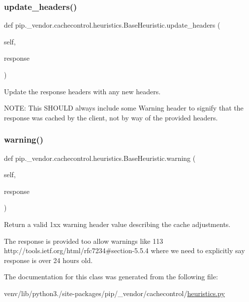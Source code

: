 \subsubsection{\texorpdfstring{update\+\_\+headers()}{update\_headers()}}
{\footnotesize\ttfamily def pip.\+\_\+vendor.\+cachecontrol.\+heuristics.\+Base\+Heuristic.\+update\+\_\+headers (\begin{DoxyParamCaption}\item[{}]{self,  }\item[{}]{response }\end{DoxyParamCaption})}

\begin{DoxyVerb}Update the response headers with any new headers.

NOTE: This SHOULD always include some Warning header to
      signify that the response was cached by the client, not
      by way of the provided headers.
\end{DoxyVerb}
 \mbox{\label{classpip_1_1__vendor_1_1cachecontrol_1_1heuristics_1_1BaseHeuristic_a60981da360ad1a5e7d01adc126f52b58}} 
\subsubsection{\texorpdfstring{warning()}{warning()}}
{\footnotesize\ttfamily def pip.\+\_\+vendor.\+cachecontrol.\+heuristics.\+Base\+Heuristic.\+warning (\begin{DoxyParamCaption}\item[{}]{self,  }\item[{}]{response }\end{DoxyParamCaption})}

\begin{DoxyVerb}Return a valid 1xx warning header value describing the cache
adjustments.

The response is provided too allow warnings like 113
http://tools.ietf.org/html/rfc7234#section-5.5.4 where we need
to explicitly say response is over 24 hours old.
\end{DoxyVerb}
 

The documentation for this class was generated from the following file\+:\begin{DoxyCompactItemize}
\item 
venv/lib/python3./site-\/packages/pip/\+\_\+vendor/cachecontrol/\hyperlink{heuristics_8py}{heuristics.\+py}\end{DoxyCompactItemize}

